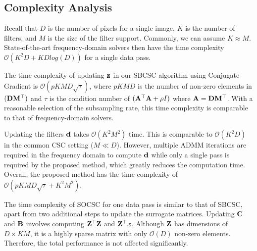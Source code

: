 \subsection{Complexity Analysis}\label{complexity}
Recall that $D$ is the number of pixels for a single image, $K$ is the
number of filters, and $M$ is the size of the filter
support. Commonly, we can assume $K \approx M$.  State-of-the-art
frequency-domain solvers then have the time complexity
$\mathcal{O}(K^2D + KDlog(D))$ for a single data pass.

The time complexity of updating $\code$ in our SBCSC algorithm using
Conjugate Gradient is $\mathcal{O}(pKMD \sqrt{\tau})$, where $pKMD$ is
the number of non-zero elements in $(\Filter \mask^\top)$ and $\tau$
is the condition number of $(\matA^\top \matA + \rho I)$ where $\matA
= \Filter \mask^\top$. With a reasonable selection of the subsampling
rate, this time complexity is comparable to that of frequency-domain
solvers.

Updating the filters $\filter$ takes $\mathcal{O}(K^2M^2)$ time. This
is comparable to $\mathcal{O}(K^2D)$ in the common CSC setting ($M \ll
D$). However, multiple ADMM iterations are required in the frequency
domain to compute $\filter$ while only a single pass is required by
the proposed method, which greatly reduces the computation
time. Overall, the proposed method has the time complexity of
$\mathcal{O}(pKMD \sqrt{\tau} + K^2M^2)$.

The time complexity of SOCSC for one data pass is similar to that of SBCSC, apart from
two additional steps to update the surrogate matrices. Updating
$\surC$ and $\surB$ involves computing $\Code^\top\Code$ and
$\Code^\top x$. Although $\Code$ has dimensions of $D \times KM$, it
is a highly sparse matrix with only $\mathcal{O}(D)$ non-zero
elements. Therefore, the total performance is not affected
significantly.



